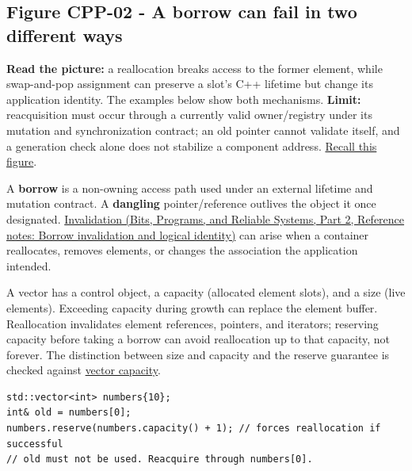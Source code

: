 \hypertarget{05-engine-i-ch003-when-a-valid-borrow-stops-naming-the-intended-thing}{}

\subsection{Figure CPP-02 - A borrow can fail in two different ways}\label{05-engine-i-ch003-figure-cpp-02---a-borrow-can-fail-in-two-different-ways}

\hypertarget{05-engine-i-ch003-figure-cpp-02---a-borrow-can-fail-in-two-different-ways}{}


\textbf{Read the picture:} a reallocation breaks access to the former element, while swap-and-pop assignment can preserve a slot's C++ lifetime but change its application identity. The examples below show both mechanisms. \textbf{Limit:} reacquisition must occur through a currently valid owner/registry under its mutation and synchronization contract; an old pointer cannot validate itself, and a generation check alone does not stabilize a component address. \hyperref[appendix-960160274237-four-figure-briefs]{Recall this figure}.

A \textbf{borrow} is a non-owning access path used under an external lifetime and mutation contract. A \textbf{dangling} pointer/reference outlives the object it once designated. \href{../01-Bits-Programs-and-Reliable-Systems-P02/main.pdf\#appendix-f9b8b9188c7f}{Invalidation (Bits, Programs, and Reliable Systems, Part 2, Reference notes: Borrow invalidation and logical identity)} can arise when a container reallocates, removes elements, or changes the association the application intended.

A vector has a control object, a capacity (allocated element slots), and a size (live elements). Exceeding capacity during growth can replace the element buffer. Reallocation invalidates element references, pointers, and iterators; reserving capacity before taking a borrow can avoid reallocation up to that capacity, not forever. The distinction between size and capacity and the reserve guarantee is checked against \href{https://eel.is/c++draft/vector.capacity}{vector capacity}.

\begin{verbatim}
std::vector<int> numbers{10};
int& old = numbers[0];
numbers.reserve(numbers.capacity() + 1); // forces reallocation if successful
// old must not be used. Reacquire through numbers[0].
\end{verbatim}

